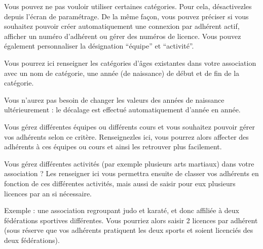 \documentclass[a4paper,10pt,oneside,french]{sphinxmanual}
\begin{document}
\sphinxAtStartPar
Vous pouvez ne pas vouloir utiliser certaines catégories. Pour cela, désactivez\sphinxhyphen{}les depuis l’écran de paramétrage.
De la même façon, vous pouvez préciser si vous souhaitez pouvoir créer automatiquement une connexion par adhérent actif, afficher un numéro d’adhérent ou gérer des numéros de licence.
Vous pouvez également personnaliser la désignation “équipe” et “activité”.
\begin{quote}

\noindent{}
\end{quote}

\sphinxAtStartPar
{}

\sphinxAtStartPar
Vous pourrez ici renseigner les catégories d’âges existantes dans votre association avec un nom de catégorie, une année (de naissance) de début et de fin de la catégorie.

\sphinxAtStartPar
Vous n’aurez pas besoin de changer les valeurs des années de naissance ultérieurement : le décalage est effectué automatiquement d’année en année.
\begin{quote}

\noindent{}
\end{quote}

\sphinxAtStartPar
{}

\sphinxAtStartPar
Vous gérez différentes équipes ou différents cours et vous souhaitez pouvoir gérer vos adhérents selon ce critère.
Renseignez\sphinxhyphen{}les ici, vous pourrez alors affecter des adhérents à ces équipes ou cours et ainsi les retrouver plus facilement.
\begin{quote}

\noindent{}
\end{quote}

\sphinxAtStartPar
{}

\sphinxAtStartPar
Vous gérez différentes activités (par exemple plusieurs arts martiaux) dans votre association ? Les renseigner ici vous permettra ensuite de classer vos adhérents en fonction de ces différentes activités, mais aussi de saisir pour eux plusieurs licences par an si nécessaire.

\sphinxAtStartPar
Exemple : une association regroupant judo et karaté, et donc affiliée à deux fédérations sportives différentes.
Vous pourriez alors saisir 2 licences par adhérent (sous réserve que vos adhérents pratiquent les deux sports et soient licenciés des deux fédérations).
\begin{quote}

\noindent{}
\end{quote}
\end{document}
